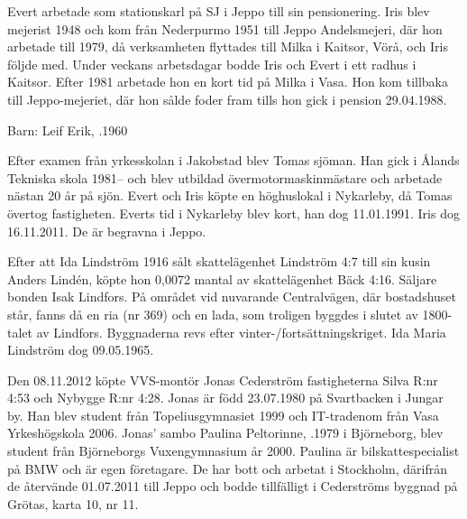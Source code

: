 Evert arbetade som 	stationskarl på SJ i Jeppo till sin pensionering. Iris blev mejerist 1948 och kom från Nederpurmo 1951 till Jeppo Andelsmejeri, där hon arbetade till 1979, då verksamheten flyttades till Milka i Kaitsor, Vörå, och Iris följde med. Under veckans arbetsdagar bodde Iris och Evert i ett radhus i Kaitsor. Efter 1981 arbetade hon en kort tid på Milka i Vasa. Hon kom tillbaka till Jeppo-mejeriet, där hon sålde foder fram tills hon gick i pension 29.04.1988.

Barn: 	 Leif Erik,	.1960

Efter examen från yrkesskolan i Jakobstad blev Tomas sjöman. Han gick i Ålands Tekniska skola 1981-- och blev utbildad övermotormaskinmästare och arbetade nästan 20 år på sjön. Evert och Iris köpte en höghuslokal i Nykarleby, då Tomas övertog fastigheten. Everts tid i Nykarleby blev kort, han dog 11.01.1991. Iris dog 16.11.2011. De är begravna i Jeppo.


Efter att Ida Lindström 1916 sålt skattelägenhet Lindström 4:7 till sin	kusin Anders Lindén, köpte hon 0,0072 mantal av skattelägenhet Bäck 4:16. Säljare bonden Isak Lindfors. På området vid nuvarande Centralvägen, där bostadshuset står, fanns då en ria (nr 369) och en lada, som troligen byggdes i slutet av 1800-talet av Lindfors. Byggnaderna revs efter vinter-/fortsättningskriget. Ida Maria Lindström dog 09.05.1965.




Den 08.11.2012 köpte VVS-montör Jonas Cederström fastigheterna Silva R:nr 4:53 och Nybygge R:nr 4:28. Jonas är född 23.07.1980 på Svartbacken i Jungar by. Han blev student från Topeliusgymnasiet 1999 och IT-tradenom från Vasa Yrkeshögskola 2006. Jonas' sambo Paulina Peltorinne, .1979 i Björneborg, blev student från Björneborgs Vuxengymnasium år 2000. Paulina är bilskattespecialist på BMW och är egen företagare. De har bott och arbetat i Stockholm, därifrån de återvände 01.07.2011 till Jeppo och bodde tillfälligt i Cederströms byggnad på Grötas, karta 10, nr 11.
\begin{jhchildren}
  \item {}
  \item {}
\end{jhchildren}


